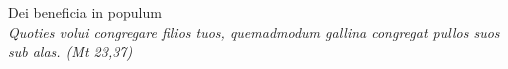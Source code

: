 


\def\greinitialformat#1{%
{\fontsize{39}{39}\selectfont #1}%
}




\vspace{0.3cm}
\begin{center}

Dei beneficia in populum\\
\textit{\small Quoties volui congregare filios tuos, quemadmodum gallina congregat pullos suos sub alas. (Mt 23,37)}
\end{center}
